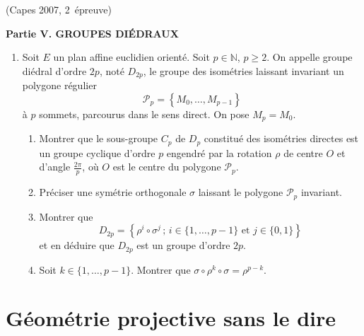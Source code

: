 \documentclass[a4paper,12pt,reqno]{amsart}
\begin{document}
\begin{exo} (Capes 2007, 2\ieme\ épreuve)

\begin{center}
  \textbf{Partie V. GROUPES DIÉDRAUX}
\end{center}

\begin{enumerate}
  \renewcommand{\theenumi}{\arabic{enumi}}
  \renewcommand{\labelenumi}{\bf\theenumi.}
  \renewcommand{\theenumii}{\alph{enumii}}
  \renewcommand{\labelenumii}{\theenumii)}

  \item Soit $E$ un plan affine euclidien orienté. Soit $p \in \mathbb{N}$, $p \geq 2$. On appelle groupe diédral d'ordre $2p$, noté $D_{2p}$, le groupe des isométries laissant invariant un polygone régulier
  \[
    \mathcal{P}_{p}=\left\{M_{0},\ldots,M_{p-1}\right\}
  \]
  à $p$ sommets, parcourus dans le sens direct. On pose $M_{p}=M_{0}$.
  \begin{enumerate}
    \item Montrer que le sous-groupe $C_{p}$ de $D_{p}$ constitué des isométries directes est un groupe cyclique d'ordre $p$ engendré par la rotation $\rho$ de centre $O$ et d'angle $\frac{2 \pi}{p}$, où $O$ est le centre du polygone $\mathcal{P}_{p}$.

    \item Préciser une symétrie orthogonale $\sigma$ laissant le polygone $\mathcal{P}_{p}$ invariant.

    \item Montrer que
    \[
      D_{2p} = \left\{
        \rho^{i}\circ \sigma^{j} \,;\, i \in \{1,\ldots,p-1\} \text{ et } j \in \{0,1\}
      \right\}
    \]
    et en déduire que $D_{2p}$ est un groupe d'ordre $2p$.

    \item Soit $k \in \{1,\ldots,p-1\}$. Montrer que $\sigma \circ \rho^{k} \circ \sigma = \rho^{p-k}$.
  \end{enumerate}
\end{enumerate}

\end{exo}

\section{Géométrie projective sans le dire}
\end{document}
